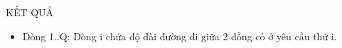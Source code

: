KẾT QUẢ  
\begin{itemize}
	\item     Dòng 1..Q: Dòng i chứa độ dài đường đi giữa 2 đồng cỏ         ở yêu cầu thứ i.   
\end{itemize}